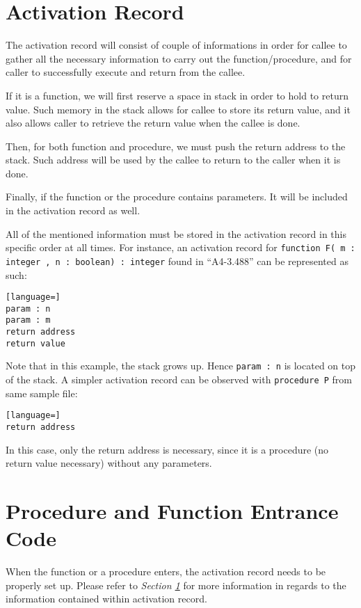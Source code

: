 \documentclass{article}
\begin{document}
\section{Activation Record} \label{rec}

The activation record will consist of couple of informations in order for callee to gather all the necessary information to carry out the function/procedure, and for caller to successfully execute and return from the callee.

If it is a function, we will first reserve a space in stack in order to hold to return value. Such memory in the stack allows for callee to store its return value, and it also allows caller to retrieve the return value when the callee is done.

Then, for both function and procedure, we must push the return address to the stack. Such address will be used by the callee to return to the caller when it is done.

Finally, if the function or the procedure contains parameters. It will be included in the activation record as well.

All of the mentioned information must be stored in the activation record in this specific order at all times. For instance, an activation record for {\tt function F( m : integer , n : boolean) : integer} found in ``A4-3.488'' can be represented as such:

\begin{lstlisting}[language=]
param : n
param : m
return address
return value
\end{lstlisting}

Note that in this example, the stack grows up. Hence {\tt param : n} is located on top of the stack. A simpler activation record can be observed with {\tt procedure P} from same sample file:

\begin{lstlisting}[language=]
return address
\end{lstlisting}

In this case, only the return address is necessary, since it is a procedure (no return value necessary) without any parameters.

\section{Procedure and Function Entrance Code}

When the function or a procedure enters, the activation record needs to be properly set up. Please refer to {\it Section \ref{rec}} for more information in regards to the information contained within activation record.
\end{document}
